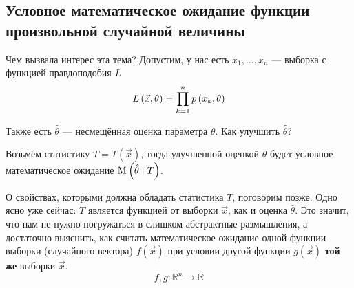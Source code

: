 \subsection{Условное математическое ожидание функции произвольной случайной величины}

Чем вызвала интерес эта тема?
Допустим, у нас есть $x_1, \dots, x_n$ --- выборка с функцией правдоподобия $L$
$$L\left( \vec{x}, \theta \right) = \prod_{k=1}^n p\left(x_k, \theta\right)$$

Также есть $\hat{\theta}$ --- несмещённая оценка параметра $\theta$.
Как улучшить $\hat{\theta}$?

Возьмём статистику $T = T\left( \vec{x} \right)$,
тогда улучшенной оценкой $\theta$ будет условное математическое ожидание
$\mathrm{M}_{} \left( \hat{\theta} \mid T \right)$.

О свойствах, которыми должна обладать статистика $T$, поговорим позже.
Одно ясно уже сейчас: $T$ является функцией от выборки $\vec{x}$,
как и оценка $\hat{\theta}$.
Это значит, что нам не нужно погружаться в слишком абстрактные размышления,
а достаточно выяснить, как считать математическое ожидание
одной функции выборки (случайного вектора) $f\left( \vec{x} \right)$
при условии другой функции $g\left( \vec{x} \right)$
\textbf{той же} выборки $\vec{x}$.
$$f,g: \mathbb{R}^n \rightarrow \mathbb{R}$$
